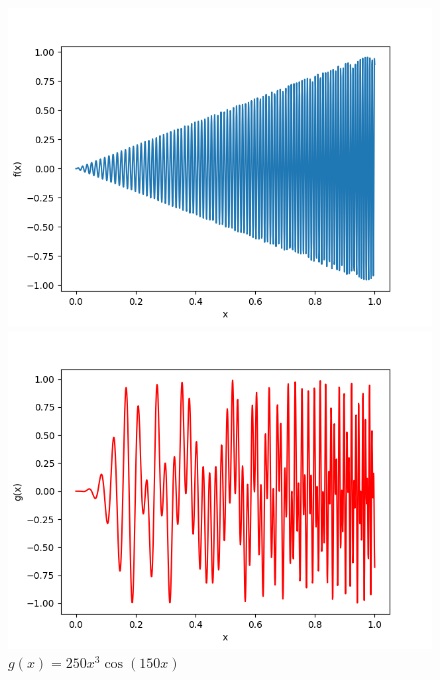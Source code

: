 \documentclass[11pt,a4paper,openright,oneside]{book}
\numberwithin{equation}{section}
\begin{document}
{\begin{figure}[H]
\begin{adjustwidth}{-30pt}{-30pt}
    \begin{minipage}[t]{0.32\linewidth}
        \centering
        \includegraphics[width=\linewidth]{media/f.png}
        \caption*{$f(x) = x\sin(200 (x+1)^2)$}
    \end{minipage}
    \begin{minipage}[t]{0.32\linewidth}
        \centering
        \includegraphics[width=\linewidth]{media/g.png}
        \caption*{$g(x)=250x^3 \cos(150x)$}
    \end{minipage}
    \begin{minipage}[t]{0.32\linewidth}
        \centering

\end{minipage}
\end{adjustwidth}
\end{figure}}
\end{document}

